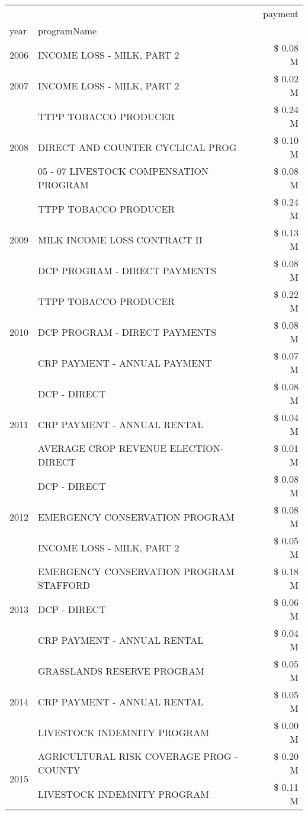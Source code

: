 \begin{tabular}{llr}
\toprule
 &  & payment \\
year & programName &  \\
\midrule
2006 & INCOME LOSS - MILK, PART 2 & \$ 0.08 M \\
\cline{1-3}
2007 & INCOME LOSS - MILK, PART 2 & \$ 0.02 M \\
\cline{1-3}
\multirow[t]{3}{*}{2008} & TTPP TOBACCO PRODUCER & \$ 0.24 M \\
 & DIRECT AND COUNTER CYCLICAL PROG & \$ 0.10 M \\
 & 05 - 07 LIVESTOCK COMPENSATION PROGRAM & \$ 0.08 M \\
\cline{1-3}
\multirow[t]{3}{*}{2009} & TTPP TOBACCO PRODUCER & \$ 0.24 M \\
 & MILK INCOME LOSS CONTRACT II & \$ 0.13 M \\
 & DCP PROGRAM - DIRECT PAYMENTS & \$ 0.08 M \\
\cline{1-3}
\multirow[t]{3}{*}{2010} & TTPP TOBACCO PRODUCER & \$ 0.22 M \\
 & DCP PROGRAM - DIRECT PAYMENTS & \$ 0.08 M \\
 & CRP PAYMENT - ANNUAL PAYMENT & \$ 0.07 M \\
\cline{1-3}
\multirow[t]{3}{*}{2011} & DCP - DIRECT & \$ 0.08 M \\
 & CRP PAYMENT - ANNUAL RENTAL & \$ 0.04 M \\
 & AVERAGE CROP REVENUE ELECTION-DIRECT & \$ 0.01 M \\
\cline{1-3}
\multirow[t]{3}{*}{2012} & DCP - DIRECT & \$ 0.08 M \\
 & EMERGENCY CONSERVATION PROGRAM & \$ 0.08 M \\
 & INCOME LOSS - MILK, PART 2 & \$ 0.05 M \\
\cline{1-3}
\multirow[t]{3}{*}{2013} & EMERGENCY CONSERVATION PROGRAM STAFFORD & \$ 0.18 M \\
 & DCP - DIRECT & \$ 0.06 M \\
 & CRP PAYMENT - ANNUAL RENTAL & \$ 0.04 M \\
\cline{1-3}
\multirow[t]{3}{*}{2014} & GRASSLANDS RESERVE PROGRAM & \$ 0.05 M \\
 & CRP PAYMENT - ANNUAL RENTAL & \$ 0.05 M \\
 & LIVESTOCK INDEMNITY PROGRAM & \$ 0.00 M \\
\cline{1-3}
\multirow[t]{3}{*}{2015} & AGRICULTURAL RISK COVERAGE PROG - COUNTY & \$ 0.20 M \\
 & LIVESTOCK INDEMNITY PROGRAM & \$ 0.11 M \\

\end{tabular}
